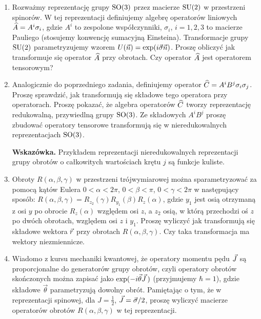 \documentclass[a4paper,11pt]{article}
\begin{document}
\begin{enumerate}

\item Rozważmy reprezentację grupy $\mathrm{SO}( 3 )$ przez macierze
  $\mathrm{SU}( 2 )$ w przestrzeni spinorów. W tej reprezentacji definiujemy
  algebrę operatorów liniowych $\widehat{A} = A^{ i } \sigma_{ i }$, gdzie
  $A^{ i }$ to zespolone współczynniki, $\sigma_{ i }$, $i = 1, 2, 3$ to
  macierze Pauliego (stosujemy konwencję sumacyjną Einsteina).
  Transformacje grupy $\mathrm{SU}( 2 )$ parametryzujemy wzorem
  $U( \vec{n} ) = \exp( i \vec{ \sigma } \vec{n} )$. Proszę obliczyć jak
  transformuje się operator $\widehat{A}$ przy obrotach. Czy operator
  $\widehat{A}$ jest operatorem tensorowym?



\item Analogicznie do poprzedniego zadania, definiujemy operator
  $\widehat{C} = A^{ i } B^{ j } \sigma_{ i } \sigma_{ j }$. Proszę sprawdzić,
  jak transformują się składowe tego operatora przy operatorach.
  Proszę pokazać, że algebra operatorów $\widehat{C}$ tworzy
  reprezentację redukowalną, przywiedlną grupy $\mathrm{SO}( 3 )$. Ze
  składowych $A^{ i } B^{ j }$ proszę zbudować operatory tensorowe
  transformują się w nieredukowalnych reprezentacjach $\mathrm{SO}( 3 )$.

  \textbf{Wskazówka.} Przykładem reprezentacji nieredukowalnych
  reprezentacji grupy obrotów o całkowitych wartościach krętu $j$ są
  funkcje kuliste.



\item Obroty $R( \alpha, \beta, \gamma )$ w przestrzeni trójwymiarowej można
  sparametryzować za pomocą kątów Eulera $0 < \alpha < 2\pi$,
  $0 < \beta < \pi$, $0 < \gamma < 2\pi$ w następujący sposób:
  $R( \alpha, \beta, \gamma ) = R_{ z_{ 2 } }( \gamma ) R_{ y_{ 1 } }( \beta ) R_{ z }( \alpha )$,
  gdzie $y_{ 1 }$ jest osią otrzymaną z osi $y$ po obrocie
  $R_{ z }( \alpha )$ względem osi $z$, a $z_{ 2 }$ osią, w którą
  przechodzi oś $z$ po dwóch obrotach, względem osi $z$ i $y_{ 1 }$.
  Proszę wyliczyć jak transformują się składowe wektora $\vec{r}$ przy
  obrotach $R( \alpha, \beta, \gamma )$. Czy taka transformacja ma wektory
  niezmiennicze.



\item Wiadomo z kursu mechaniki kwantowej, że operatory momentu pędu
  $\vec{J}$ są proporcjonalne do generatorów grupy obrotów, czyli operatory
  obrotów skończonych można zapisać jako $\exp( -i \vec{ \theta } \vec{J} \, )$
  (przyjmujemy $\hbar = 1$), gdzie składowe $\vec{ \theta }$ parametryzują dowolny
  obrót. Pamiętając o tym, że w reprezentacji spinowej, dla
  $J = \frac{ 1 }{ 2 }$, $\vec{J} = \vec{ \sigma } / 2$, proszę wyliczyć macierze
  operatorów obrotów $R( \alpha, \beta, \gamma )$ w tej reprezentacji.




\end{enumerate}
\end{document}
